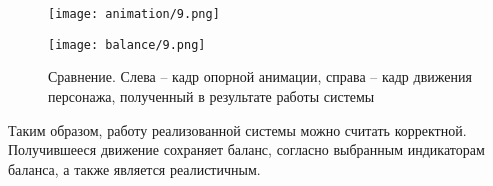 \begin{figure}[ht]
  \centering
  \begin{minipage}{0.33\textwidth}
    \centering
    \texttt{[image: animation/9.png]}
  \end{minipage}
  \begin{minipage}{0.33\textwidth}
    \centering
    \texttt{[image: balance/9.png]}
  \end{minipage}
  \hfill
  \caption{Сравнение. Слева -- кадр опорной анимации, справа -- кадр движения персонажа, полученный в результате работы системы}
  \label{fig:comparison}
\end{figure}

Таким образом, работу реализованной системы можно считать корректной. Получившееся движение сохраняет баланс, согласно выбранным индикаторам баланса, а также является реалистичным.
